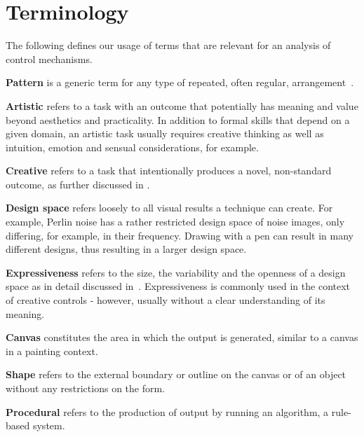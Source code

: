 
\section{Terminology}\label{terminology}
The following defines our usage of terms that are relevant for an analysis of control mechanisms. 

\textbf{Pattern} is a generic term for any type of repeated, often regular, arrangement~\cite{oed_2017}.


\textbf{Artistic} refers to a task with an outcome that potentially has meaning and value beyond aesthetics and practicality. In addition to formal skills that depend on a given domain, an artistic task usually requires creative thinking as well as intuition, emotion and sensual considerations, for example.

\textbf{Creative} refers to a task that intentionally produces a novel, non-standard outcome, as further discussed in . 

\textbf{Design space} refers loosely to all visual results a technique can create. For example, Perlin noise has a rather restricted design space of noise images, only differing, for example, in their frequency. Drawing with a pen can result in many different designs, thus resulting in a larger design space.

\textbf{Expressiveness} refers to the size, the variability and the openness of a design space as in detail discussed in~. Expressiveness is commonly used in the context of creative controls - however, usually without a clear understanding of its meaning.

\textbf{Canvas} constitutes the area in which the output is generated, similar to a canvas in a painting context.

\textbf{Shape} refers to the external boundary or outline on the canvas or of an object without any restrictions on the form. 

\textbf{Procedural} refers to the production of output by running an algorithm,  a rule-based system.

